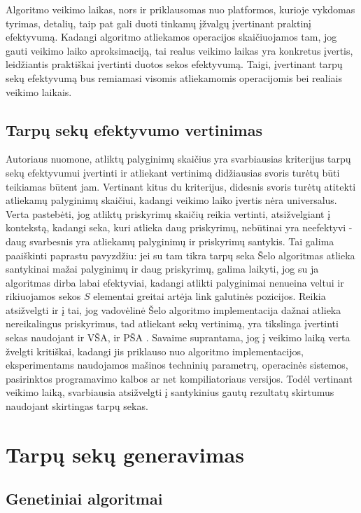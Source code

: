\documentclass{VUMIFInfKursinis}
\begin{document}
Algoritmo veikimo laikas, nors ir priklausomas nuo platformos, kurioje vykdomas tyrimas, detalių,
taip pat gali duoti tinkamų įžvalgų įvertinant praktinį efektyvumą.
Kadangi algoritmo atliekamos operacijos skaičiuojamos tam, jog gauti
veikimo laiko aproksimaciją, tai realus veikimo laikas
yra konkretus įvertis, leidžiantis praktiškai įvertinti duotos sekos efektyvumą.
Taigi, įvertinant tarpų sekų efektyvumą bus remiamasi visomis atliekamomis operacijomis bei realiais veikimo laikais.

\subsection{Tarpų sekų efektyvumo vertinimas}

Autoriaus nuomone, atliktų palyginimų skaičius yra svarbiausias kriterijus tarpų sekų efektyvumui įvertinti ir
atliekant vertinimą didžiausias svoris turėtų būti teikiamas būtent jam.
Vertinant kitus du kriterijus, didesnis svoris turėtų atitekti atliekamų palyginimų skaičiui,
kadangi veikimo laiko įvertis nėra universalus.
Verta pastebėti, jog atliktų priskyrimų skaičių reikia vertinti, atsižvelgiant į kontekstą, kadangi
seka, kuri atlieka daug priskyrimų, nebūtinai yra neefektyvi - daug svarbesnis yra atliekamų palyginimų ir priskyrimų santykis.
Tai galima paaiškinti paprastu pavyzdžiu: jei su tam tikra tarpų seka Šelo algoritmas atlieka santykinai mažai palyginimų ir daug priskyrimų, galima laikyti,
jog su ja algoritmas dirba labai efektyviai, kadangi atlikti palyginimai nenueina veltui ir rikiuojamos sekos $S$ elementai greitai artėja link galutinės pozicijos.
Reikia atsižvelgti ir į tai, jog vadovėlinė Šelo algoritmo implementacija dažnai atlieka nereikalingus priskyrimus,
tad atliekant sekų vertinimą, yra tikslinga įvertinti sekas naudojant ir VŠA, ir PŠA \cite{Radavičius_Baranauskas_2013}.
Savaime suprantama, jog į veikimo laiką verta žvelgti kritiškai, kadangi jis priklauso nuo algoritmo implementacijos,
eksperimentams naudojamos mašinos techninių parametrų, operacinės sistemos, pasirinktos programavimo kalbos ar net kompiliatoriaus versijos.
Todėl vertinant veikimo laiką, svarbiausia atsižvelgti į santykinius gautų rezultatų skirtumus naudojant skirtingas tarpų sekas.

\section{Tarpų sekų generavimas}

\subsection{Genetiniai algoritmai}
\end{document}
